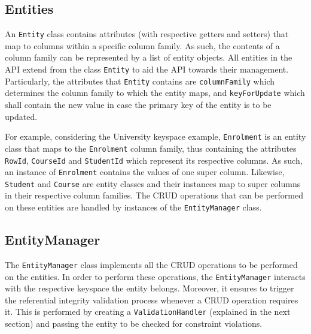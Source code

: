 	\subsection{Entities} 
	
	An \texttt{Entity} class contains attributes (with respective getters and
	setters) that map to columns within a specific column family.  As such,  the contents of a
	column family can be represented by a list of entity objects.  All entities in
	the \ac{API} extend from the class \texttt{Entity}  to
	aid the \ac{API} towards their management.  Particularly,  the attributes
	that \texttt{Entity} contains  are \texttt{columnFamily} which
	determines the column family to which the entity maps,  and 
	\texttt{keyForUpdate} which shall contain the new value in case the primary key
	of the entity is to be updated. 
	
	For example,   considering the University keyspace example,  \texttt{Enrolment} 
	is an entity class that  maps to the \texttt{Enrolment}  column family,  thus
	containing the attributes \texttt{RowId},  \texttt{CourseId} and
	\texttt{StudentId} which represent its respective columns.  As such,  an
	instance of \texttt{Enrolment} contains the values of one super column.  Likewise, 
	\texttt{Student} and \texttt{Course} are entity classes and their instances 
	map to   super columns in their respective column families. 
	The \ac{CRUD} operations that can be performed on these entities   are
	handled by instances of the \texttt{EntityManager} class. 
		
	\subsection{EntityManager} \label{ss:Implementation-API-EntityManager}

	The  \texttt{EntityManager} class implements  all
	the \ac{CRUD} operations to be performed on the entities.  In order to perform
	these operations,   the \texttt{EntityManager} interacts with the respective
	keyspace the entity belongs.  Moreover,  it ensures to trigger the   referential
	integrity validation process whenever a \ac{CRUD} operation requires it.  This
	is performed by creating a  \texttt{ValidationHandler} (explained in the next
	section) and passing the entity to be checked for constraint violations.  
	
